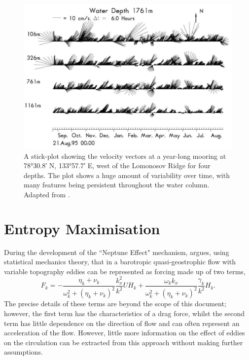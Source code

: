 \documentclass[12pt,a4paper]{report}
\begin{document}
\begin{figure}
	\centering
	\includegraphics[width=\linewidth]{Woodgate2001Mooring}
	\caption[Adapted from \cite{woodgate2001arctic}]{A  stick-plot showing the velocity vectors at 
		a year-long mooring at \ang{78;30.8;} N, \ang{133;57.7;} E, west of the Lomonosov Ridge for four depths.  The plot shows a huge amount of variability over time, with many
		features being persistent throughout the water column. Adapted from \cite{woodgate2001arctic}.}
	\label{fig:Woodgate2001Mooring}
\end{figure}

  
                      \section{Entropy  Maximisation}
                      \label{entropy}
                     
                	
                	During the development of the ``Neptune Effect" mechanism, \cite{holloway1987systematic} argues, using statistical mechanics theory, that in a barotropic quasi-geostrophic flow with variable topography eddies can be represented as forcing made up of two terms,
                	\begin{equation*}
                	F_{k}=-\frac{\eta_{k}+\nu_{k}}{\omega_{k}^{2}
                		+\left(\eta_{k}+\nu_{k}\right)^{2}}\frac{k_{x}^{2}}{k^{2}}UH_{k}
                	+\frac{\omega_{k}k_{x}}{\omega_{k}^{2}
                		+\left(\eta_{k}+\nu_{k}\right)^{2}}\frac{\gamma_{k}}{k^{2}}H_{k}.
                	\end{equation*} 
                	The precise details of these terms are beyond the scope of this
                	document; however, the first term has the characteristics of a drag
                	force, whilst the second term has little dependence on the direction
                	of flow and can often represent an acceleration of the flow. However,
                	little more information on the effect of eddies on the circulation
                	can be extracted from this approach without making further
                	assumptions.  
                	
\end{document}
